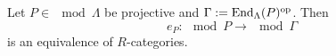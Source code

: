 %









\begin{proposition}\label{3.2.3}
  Let $P \in \mod{\Lambda}$ be projective and $\Gamma := \operatorname{End}_\Lambda(P)^{\mathrm{op}}$. Then
  \[
  e_P : \mod{P} \to \mod{\Gamma}
  \]
is an equivalence of $R$-categories.
\end{proposition}

